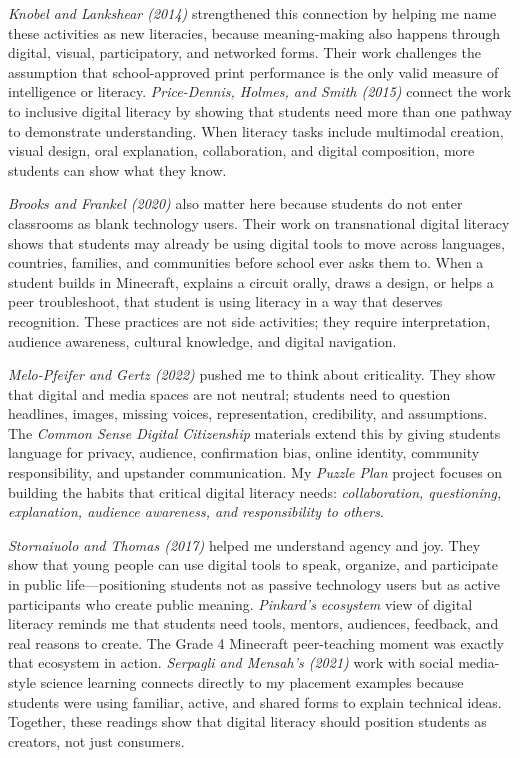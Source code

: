 \documentclass[11pt]{article}
\begin{document}
\textit{Knobel and Lankshear (2014)} strengthened this connection by helping me name these activities as new literacies, because meaning-making also happens through digital, visual, participatory, and networked forms. Their work challenges the assumption that school-approved print performance is the only valid measure of intelligence or literacy. \textit{Price-Dennis, Holmes, and Smith (2015)} connect the work to inclusive digital literacy by showing that students need more than one pathway to demonstrate understanding. When literacy tasks include multimodal creation, visual design, oral explanation, collaboration, and digital composition, more students can show what they know.

\textit{Brooks and Frankel (2020)} also matter here because students do not enter classrooms as blank technology users. Their work on transnational digital literacy shows that students may already be using digital tools to move across languages, countries, families, and communities before school ever asks them to. When a student builds in Minecraft, explains a circuit orally, draws a design, or helps a peer troubleshoot, that student is using literacy in a way that deserves recognition. These practices are not side activities; they require interpretation, audience awareness, cultural knowledge, and digital navigation.

\textit{Melo-Pfeifer and Gertz (2022)} pushed me to think about criticality. They show that digital and media spaces are not neutral; students need to question headlines, images, missing voices, representation, credibility, and assumptions. The \textit{Common Sense Digital Citizenship} materials extend this by giving students language for privacy, audience, confirmation bias, online identity, community responsibility, and upstander communication. My \textit{Puzzle Plan} project focuses on building the habits that critical digital literacy needs: \textit{collaboration, questioning, explanation, audience awareness, and responsibility to others}.

\textit{Stornaiuolo and Thomas (2017)} helped me understand agency and joy. They show that young people can use digital tools to speak, organize, and participate in public life---positioning students not as passive technology users but as active participants who create public meaning. \textit{Pinkard's ecosystem} view of digital literacy reminds me that students need tools, mentors, audiences, feedback, and real reasons to create. The Grade 4 Minecraft peer-teaching moment was exactly that ecosystem in action. \textit{Serpagli and Mensah's (2021)} work with social media-style science learning connects directly to my placement examples because students were using familiar, active, and shared forms to explain technical ideas. Together, these readings show that digital literacy should position students as creators, not just consumers.
\end{document}
